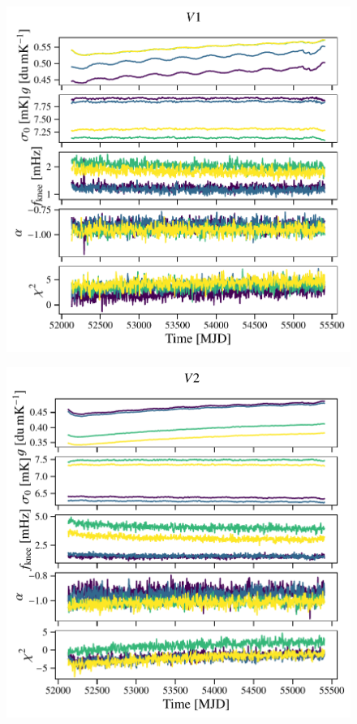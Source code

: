 \documentclass[twocolumn]{../../common/aa}
\begin{document}
\begin{figure}
	\centering
	\includegraphics[width=\columnwidth]{figures/inst_060-WMAP_V1.pdf}
\end{figure}
\begin{figure}
	\centering
	\includegraphics[width=\columnwidth]{figures/inst_060-WMAP_V2.pdf}
\end{figure}
\end{document}
